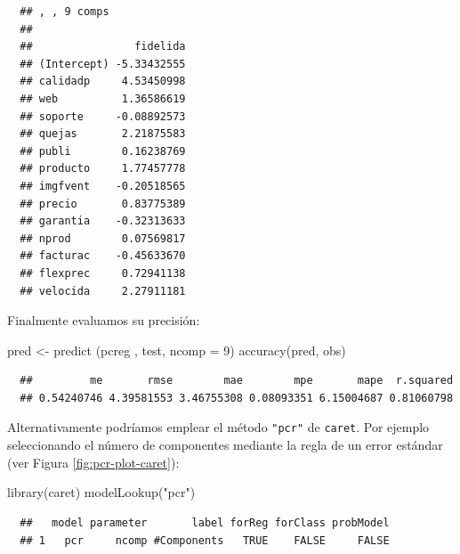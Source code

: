 \documentclass[
]{book}
\newenvironment{Shaded}{\begin{snugshade}}{\end{snugshade}}
\newcommand{\AttributeTok}[1]{\textcolor[rgb]{0.77,0.63,0.00}{#1}}
\newcommand{\DecValTok}[1]{\textcolor[rgb]{0.00,0.00,0.81}{#1}}
\newcommand{\FunctionTok}[1]{\textcolor[rgb]{0.00,0.00,0.00}{#1}}
\newcommand{\NormalTok}[1]{#1}
\newcommand{\OtherTok}[1]{\textcolor[rgb]{0.56,0.35,0.01}{#1}}
\newcommand{\StringTok}[1]{\textcolor[rgb]{0.31,0.60,0.02}{#1}}
\theoremstyle{break}
\theoremstyle{nonumberplain}
\begin{document}
\begin{verbatim}
  ## , , 9 comps
  ## 
  ##                fidelida
  ## (Intercept) -5.33432555
  ## calidadp     4.53450998
  ## web          1.36586619
  ## soporte     -0.08892573
  ## quejas       2.21875583
  ## publi        0.16238769
  ## producto     1.77457778
  ## imgfvent    -0.20518565
  ## precio       0.83775389
  ## garantia    -0.32313633
  ## nprod        0.07569817
  ## facturac    -0.45633670
  ## flexprec     0.72941138
  ## velocida     2.27911181
\end{verbatim}

Finalmente evaluamos su precisión:

\begin{Shaded}
\begin{Highlighting}[]
\NormalTok{pred }\OtherTok{\textless{}{-}} \FunctionTok{predict}\NormalTok{ (pcreg , test, }\AttributeTok{ncomp =} \DecValTok{9}\NormalTok{)}
\FunctionTok{accuracy}\NormalTok{(pred, obs)}
\end{Highlighting}
\end{Shaded}

\begin{verbatim}
  ##         me       rmse        mae        mpe       mape  r.squared 
  ## 0.54240746 4.39581553 3.46755308 0.08093351 6.15004687 0.81060798
\end{verbatim}

Alternativamente podríamos emplear el método \texttt{"pcr"} de \texttt{caret}.
Por ejemplo seleccionando el número de componentes mediante la regla de un error estándar (ver Figura \ref{fig:pcr-plot-caret}):

\begin{Shaded}
\begin{Highlighting}[]
\FunctionTok{library}\NormalTok{(caret)}
\FunctionTok{modelLookup}\NormalTok{(}\StringTok{"pcr"}\NormalTok{)}
\end{Highlighting}
\end{Shaded}

\begin{verbatim}
  ##   model parameter       label forReg forClass probModel
  ## 1   pcr     ncomp #Components   TRUE    FALSE     FALSE
\end{verbatim}
\end{document}
